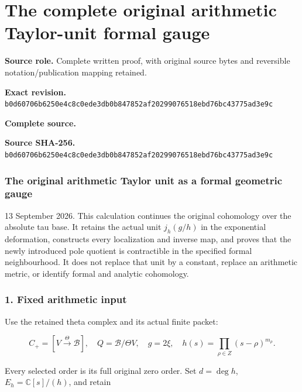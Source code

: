 \begingroup

\section{The complete original arithmetic Taylor-unit formal gauge}


\begingroup
\sloppy
\small

\noindent\textbf{Source role.} Complete written proof, with original source bytes and reversible notation/publication mapping retained.\par
\noindent\textbf{Exact revision.} \nolinkurl{b0d60706b6250e4c8c0ede3db0b847852af20299076518ebd76bc43775ad3e9c}\par
\noindent\textbf{Complete source.} \par
\noindent\textbf{Source SHA-256.} \nolinkurl{b0d60706b6250e4c8c0ede3db0b847852af20299076518ebd76bc43775ad3e9c}\par\medskip
\subsubsection{The original arithmetic Taylor unit as a formal geometric gauge}\label{endpoint-f1_unit_gauge--the-original-arithmetic-taylor-unit-as-a-formal-geometric-gauge}

13 September 2026. This calculation continues the original cohomology over the absolute tau base. It retains the actual unit \(j_h(g/h)\) in the exponential deformation, constructs every localization and inverse map, and proves that the newly introduced pole quotient is contractible in the specified formal neighbourhood. It does not replace that unit by a constant, replace an arithmetic metric, or identify formal and analytic cohomology.

\subsubsection{1. Fixed arithmetic input}\label{endpoint-f1_unit_gauge--fixed-arithmetic-input}

Use the retained theta complex and its actual finite packet:

\[
C_+=[V\xrightarrow{\Theta}\mathscr B],\quad
Q=\mathscr B/\Theta V,\quad g=2\xi,\quad
h(s)=\prod_{\rho\in Z}(s-\rho)^{m_\rho}.
\tag{UG1}
\]

Every selected order is its full original zero order. Set \(d=\deg h\), \(E_h=\mathbb C[s]/(h)\), and retain

